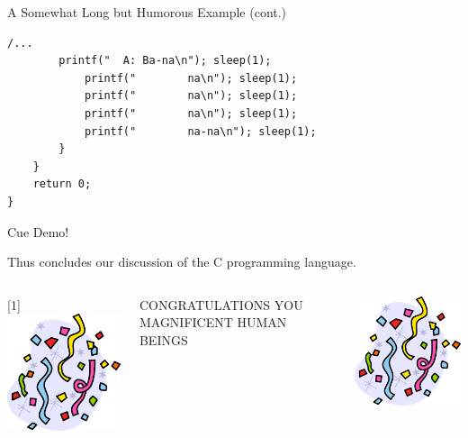\documentclass[11pt]{beamer}
\begin{document}
\begin{frame}[fragile=singleslide]{A Somewhat Long but Humorous Example (cont.)}
\begin{lstlisting}[style=C]
/...
	    printf("  A: Ba-na\n"); sleep(1);
        	printf("        na\n"); sleep(1);
        	printf("        na\n"); sleep(1);
        	printf("        na\n"); sleep(1);
        	printf("        na-na\n"); sleep(1);
        }
    } 
    return 0; 
}
\end{lstlisting}
\center
Cue Demo! 
\end{frame}

\begin{frame}
\center
Thus concludes our discussion of the C programming language.
\begin{columns}
\begin{column}{0.25\textwidth}
\center
\scalebox{-1}[1]{\includegraphics[scale=0.25]{party.png}}
\end{column}
\begin{column}{0.5\textwidth}
\center
\LARGE{CONGRATULATIONS YOU MAGNIFICENT HUMAN BEINGS} \\
\end{column}
\begin{column}{0.25\textwidth}
\center
\includegraphics[scale=0.25]{party.png}
\end{column}
\end{columns}

\end{frame}
\end{document}

